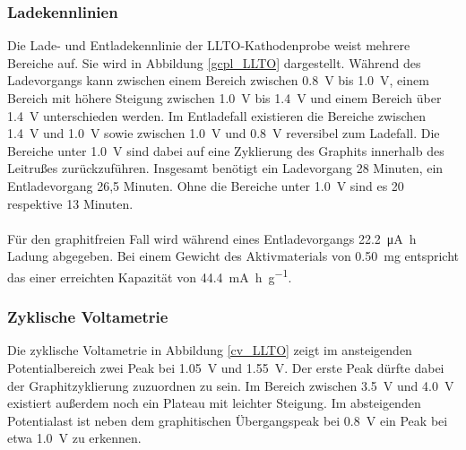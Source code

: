 \documentclass[a4paper, 11pt, headsepline,footsepline,twoside,abstract]{scrbook}
\begin{document}
\subsubsection{Ladekennlinien}
Die Lade- und Entladekennlinie der LLTO-Kathodenprobe weist mehrere Bereiche auf. Sie wird in Abbildung \ref{gcpl_LLTO} dargestellt. Während des Ladevorgangs kann zwischen einem Bereich zwischen \SI{0.8}{\volt} bis \SI{1.0}{\volt}, einem Bereich mit höhere Steigung zwischen \SI{1.0}{\volt} bis \SI{1.4}{\volt} und einem Bereich über \SI{1.4}{\volt} unterschieden werden. Im Entladefall existieren die Bereiche zwischen \SI{1.4}{\volt} und \SI{1.0}{\volt} sowie zwischen \SI{1.0}{\volt} und \SI{0.8}{\volt} reversibel zum Ladefall. Die Bereiche unter \SI{1.0}{\volt} sind dabei auf eine Zyklierung des Graphits innerhalb des Leitrußes zurückzuführen. Insgesamt benötigt ein Ladevorgang 28 Minuten, ein Entladevorgang 26,5 Minuten. Ohne die Bereiche unter \SI{1.0}{\volt} sind es 20 respektive 13 Minuten.
\\\\
Für den graphitfreien Fall  wird während eines Entladevorgangs \SI{22.2}{\micro\ampere\hour} Ladung abgegeben. Bei einem Gewicht des Aktivmaterials von \SI{0.50}{\milli\gram} entspricht das einer erreichten Kapazität von \SI{44.4}{\milli\ampere\hour\per\gram}.
\subsubsection{Zyklische Voltametrie}
Die zyklische Voltametrie in Abbildung \ref{cv_LLTO} zeigt im ansteigenden Potentialbereich zwei Peak bei \SI{1.05}{\volt} und \SI{1.55}{\volt}. Der erste Peak dürfte dabei der Graphitzyklierung zuzuordnen zu sein.  Im Bereich zwischen \SI{3.5}{\volt} und \SI{4.0}{\volt} existiert außerdem noch ein Plateau mit leichter Steigung. Im absteigenden Potentialast ist neben dem graphitischen Übergangspeak bei \SI{0.8}{\volt} ein Peak bei etwa \SI{1.0}{\volt} zu erkennen.
\end{document}
